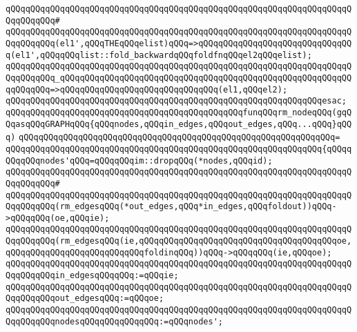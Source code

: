 \verb|qQQqqQQqqQQqqQQqqQQqqQQqqQQqqQQqqQQqqQQqqQQqqQQqqQQqqQQqqQQqqQQqqQQqqQQqqQQqqQQq#|\newline
\verb|qQQqqQQqqQQqqQQqqQQqqQQqqQQqqQQqqQQqqQQqqQQqqQQqqQQqqQQqqQQqqQQqqQQqqQQqqQQqqQQq(el1',qQQqTHEqQQqelist)qQQq=>qQQqqQQqqQQqqQQqqQQqqQQqqQQqqQQq(el1',qQQqqQQqlist::fold_backwardqQQqfoldfnqQQqel2qQQqelist);|\newline
\verb|qQQqqQQqqQQqqQQqqQQqqQQqqQQqqQQqqQQqqQQqqQQqqQQqqQQqqQQqqQQqqQQqqQQqqQQqqQQqqQQq_qQQqqQQqqQQqqQQqqQQqqQQqqQQqqQQqqQQqqQQqqQQqqQQqqQQqqQQqqQQqqQQqqQQq=>qQQqqQQqqQQqqQQqqQQqqQQqqQQqqQQq(el1,qQQqel2);|\newline
\verb|qQQqqQQqqQQqqQQqqQQqqQQqqQQqqQQqqQQqqQQqqQQqqQQqqQQqqQQqqQQqqQQqesac;|\newline
\newline
\newline
\verb|qQQqqQQqqQQqqQQqqQQqqQQqqQQqqQQqqQQqqQQqqQQqqQQqfunqQQqrm_nodeqQQq(gqQQqasqQQqGRAPHqQQq{qQQqnodes,qQQqin_edges,qQQqout_edges,qQQq...qQQq}qQQq)|\newline
\verb|qQQqqQQqqQQqqQQqqQQqqQQqqQQqqQQqqQQqqQQqqQQqqQQqqQQqqQQqqQQqqQQq=|\newline
\verb|qQQqqQQqqQQqqQQqqQQqqQQqqQQqqQQqqQQqqQQqqQQqqQQqqQQqqQQqqQQqqQQq{qQQqqQQqqQQqnodes'qQQq=qQQqqQQqim::dropqQQq(*nodes,qQQqid);|\newline
\verb|qQQqqQQqqQQqqQQqqQQqqQQqqQQqqQQqqQQqqQQqqQQqqQQqqQQqqQQqqQQqqQQqqQQqqQQqqQQqqQQq#|\newline
\verb|qQQqqQQqqQQqqQQqqQQqqQQqqQQqqQQqqQQqqQQqqQQqqQQqqQQqqQQqqQQqqQQqqQQqqQQqqQQqqQQq(rm_edgesqQQq(*out_edges,qQQq*in_edges,qQQqfoldout))qQQq->qQQqqQQq(oe,qQQqie);|\newline
\verb|qQQqqQQqqQQqqQQqqQQqqQQqqQQqqQQqqQQqqQQqqQQqqQQqqQQqqQQqqQQqqQQqqQQqqQQqqQQqqQQq(rm_edgesqQQq(ie,qQQqqQQqqQQqqQQqqQQqqQQqqQQqqQQqqQQqqQQqoe,qQQqqQQqqQQqqQQqqQQqqQQqqQQqfoldinqQQq))qQQq->qQQqqQQq(ie,qQQqoe);|\newline
\newline
\verb|qQQqqQQqqQQqqQQqqQQqqQQqqQQqqQQqqQQqqQQqqQQqqQQqqQQqqQQqqQQqqQQqqQQqqQQqqQQqqQQqin_edgesqQQqqQQq:=qQQqie;|\newline
\verb|qQQqqQQqqQQqqQQqqQQqqQQqqQQqqQQqqQQqqQQqqQQqqQQqqQQqqQQqqQQqqQQqqQQqqQQqqQQqqQQqout_edgesqQQq:=qQQqoe;|\newline
\newline
\verb|qQQqqQQqqQQqqQQqqQQqqQQqqQQqqQQqqQQqqQQqqQQqqQQqqQQqqQQqqQQqqQQqqQQqqQQqqQQqqQQqnodesqQQqqQQqqQQqqQQq:=qQQqnodes';|\newline
\newline

